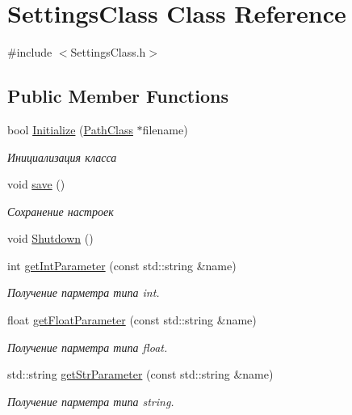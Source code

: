 \hypertarget{class_settings_class}{}\section{Settings\+Class Class Reference}
\label{class_settings_class}


{\ttfamily \#include $<$Settings\+Class.\+h$>$}

\subsection*{Public Member Functions}
\begin{DoxyCompactItemize}
\item 
bool \hyperlink{class_settings_class_a83f3762c91a0be60d3f00041ce98f67a}{Initialize} (\hyperlink{class_path_class}{Path\+Class} $\ast$filename)
\begin{DoxyCompactList}\small\item\em Инициализация класса \end{DoxyCompactList}\item 
void \hyperlink{class_settings_class_aed2eed64341b05032b56af02fc1f83ce}{save} ()
\begin{DoxyCompactList}\small\item\em Сохранение настроек \end{DoxyCompactList}\item 
void \hyperlink{class_settings_class_a2dd3fc68cc74b2d767c8255c2fe4ff91}{Shutdown} ()
\item 
int \hyperlink{class_settings_class_ad730e5806c7f08684108e12236ca87c0}{get\+Int\+Parameter} (const std\+::string \&name)
\begin{DoxyCompactList}\small\item\em Получение парметра типа int. \end{DoxyCompactList}\item 
float \hyperlink{class_settings_class_a5ab90d79de57f0c7c65ca812d699670a}{get\+Float\+Parameter} (const std\+::string \&name)
\begin{DoxyCompactList}\small\item\em Получение парметра типа float. \end{DoxyCompactList}\item 
std\+::string \hyperlink{class_settings_class_a87c73c3b4a33b8b5937bd5c64afb348d}{get\+Str\+Parameter} (const std\+::string \&name)
\begin{DoxyCompactList}\small\item\em Получение парметра типа string. \end{DoxyCompactList}\item 

\end{DoxyCompactItemize}
